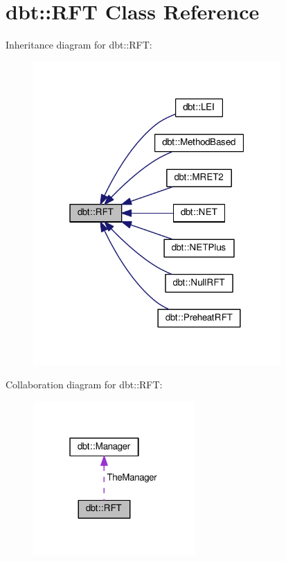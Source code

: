 \hypertarget{classdbt_1_1_r_f_t}{}\section{dbt\+:\+:R\+FT Class Reference}
\label{classdbt_1_1_r_f_t}


Inheritance diagram for dbt\+:\+:R\+FT\+:\nopagebreak
\begin{figure}[H]
\begin{center}
\leavevmode
\includegraphics[width=268pt]{classdbt_1_1_r_f_t__inherit__graph}
\end{center}
\end{figure}


Collaboration diagram for dbt\+:\+:R\+FT\+:\nopagebreak
\begin{figure}[H]
\begin{center}
\leavevmode
\includegraphics[width=175pt]{classdbt_1_1_r_f_t__coll__graph}
\end{center}
\end{figure}
